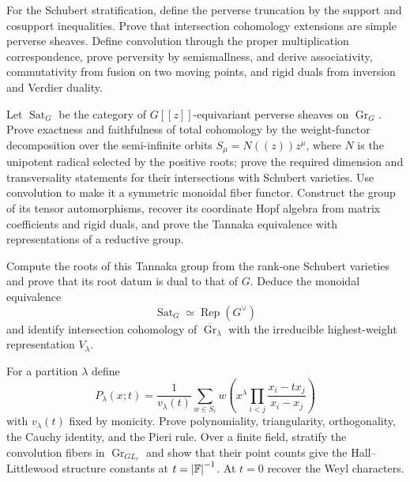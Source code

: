 \begin{exercise}
For the Schubert stratification, define the perverse truncation by the support
and cosupport inequalities.  Prove that intersection cohomology
extensions are simple perverse sheaves.  Define convolution through the
proper multiplication correspondence, prove perversity by semismallness, and
derive associativity, commutativity from fusion on two moving points, and
rigid duals from inversion and Verdier duality.
\end{exercise}

\begin{exercise}
Let $\operatorname{Sat}_G$ be the category of $G[[z]]$-equivariant perverse
sheaves on $\operatorname{Gr}_G$.  Prove exactness and faithfulness of total
cohomology by the weight-functor decomposition over the semi-infinite orbits
$S_\mu=N((z))z^\mu$, where $N$ is the unipotent radical selected by the
positive roots; prove the required dimension and transversality statements
for their intersections with Schubert varieties.
Use convolution to make it a symmetric monoidal fiber functor.  Construct the
group of its tensor automorphisms, recover its coordinate Hopf algebra from
matrix coefficients and rigid duals, and prove the Tannaka equivalence with
representations of a reductive group.
\end{exercise}

\begin{exercise}
Compute the roots of this Tannaka group from the
rank-one Schubert varieties and prove that its root datum is dual to that of
$G$.  Deduce the monoidal equivalence
\[
 \operatorname{Sat}_G\simeq\operatorname{Rep}(G^\vee)
\]
and identify intersection cohomology of $\overline{\operatorname{Gr}}_\lambda$
with the irreducible highest-weight representation $V_\lambda$.
\end{exercise}

\begin{exercise}
For a partition $\lambda$ define
\[
 P_\lambda(x;t)=\frac1{v_\lambda(t)}
 \sum_{w\in S_r}w\!\left(x^\lambda
 \prod_{i<j}\frac{x_i-tx_j}{x_i-x_j}\right)
\]
with $v_\lambda(t)$ fixed by monicity.  Prove polynomiality, triangularity,
orthogonality, the Cauchy identity, and the Pieri rule.  Over a finite field,
stratify the convolution fibers in $\operatorname{Gr}_{GL_r}$ and show that
their point counts give the Hall--Littlewood structure constants at
$t=\left\lvert \mathbb F\right\rvert^{-1}$.  At $t=0$ recover the Weyl characters.
\end{exercise}

